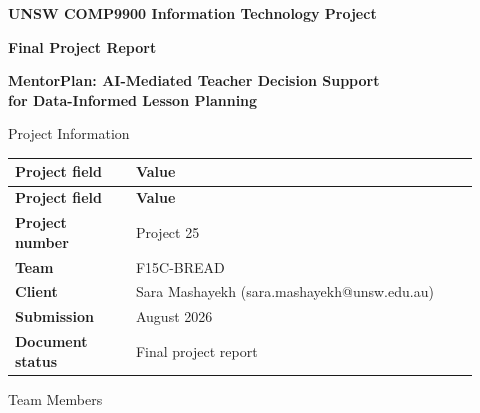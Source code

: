 \documentclass[11pt,a4paper]{article}
\begin{document}
\begin{center}
{\fontsize{21}{25}\selectfont\bfseries UNSW COMP9900 Information Technology Project\par}
\vspace{0.75em}
{\fontsize{19}{23}\selectfont\bfseries Final Project Report\par}
\vspace{1.25em}
{\fontsize{14}{18}\selectfont\bfseries MentorPlan: AI-Mediated Teacher Decision Support\\for Data-Informed Lesson Planning\par}
\end{center}

\vspace{0.6em}
{\fontsize{14}{17}\selectfont Project Information\par}

\begin{small}

\setlength{\tabcolsep}{8pt}

\begin{longtable}{>{\raggedright\arraybackslash}p{0.24\linewidth}>{\raggedright\arraybackslash}p{0.68\linewidth}}

\hline

\textbf{Project field} & \textbf{Value} \\ \hline

\endfirsthead

\hline

\textbf{Project field} & \textbf{Value} \\ \hline

\endhead

\textbf{Project number} & Project 25 \\ \hline

\textbf{Team} & F15C-BREAD \\ \hline

\textbf{Client} & Sara Mashayekh (sara.mashayekh@unsw.edu.au) \\ \hline

\textbf{Submission} & 9 August 2026 \\ \hline

\textbf{Document status} & Final project report \\ \hline

\end{longtable}

\end{small}

\vspace{-0.7em}
{\fontsize{14}{17}\selectfont Team Members\par}
\end{document}
